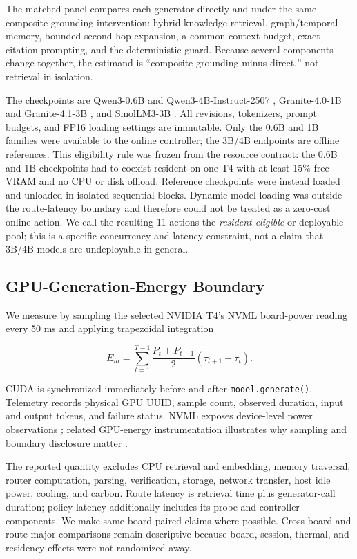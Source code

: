 The matched panel compares each generator directly and under the same composite
grounding intervention: hybrid knowledge retrieval, graph/temporal memory, bounded
second-hop expansion, a common context budget, exact-citation prompting, and the
deterministic guard. Because several components change together, the estimand is
``composite grounding minus direct,'' not retrieval in isolation.



The checkpoints are Qwen3-0.6B and Qwen3-4B-Instruct-2507
\cite{QwenTeam2025Qwen3,QwenModelCard06,QwenModelCard4B}, Granite-4.0-1B and
Granite-4.1-3B \cite{GraniteTeam2025Granite40,GraniteTeam2026Granite41}, and
SmolLM3-3B \cite{BakouchEtAl2025SmolLM3}. All revisions, tokenizers, prompt budgets,
and FP16 loading settings are immutable. Only the 0.6B and 1B families were
available to the online controller; the 3B/4B endpoints are offline references.
This eligibility rule was frozen from the resource contract: the 0.6B and 1B
checkpoints had to coexist resident on one T4 with at least 15\% free VRAM and no
CPU or disk offload. Reference checkpoints were instead loaded and unloaded in
isolated sequential blocks. Dynamic model loading was outside the route-latency
boundary and therefore could not be treated as a zero-cost online action. We call
the resulting 11 actions the \emph{resident-eligible} or deployable pool; this is a
specific concurrency-and-latency constraint, not a claim that 3B/4B models are
undeployable in general.

\subsection{GPU-Generation-Energy Boundary}

We measure \gpuenergy{} by sampling the selected NVIDIA T4's NVML board-power
reading every 50 ms and applying trapezoidal integration

\begin{equation}
E_{ia}=\sum_{t=1}^{T-1}
\frac{P_t+P_{t+1}}{2}(\tau_{t+1}-\tau_t).
\label{eq:energy}
\end{equation}

CUDA is synchronized immediately before and after \texttt{model.generate()}.
Telemetry records physical GPU UUID, sample count, observed duration, input and
output tokens, and failure status. NVML exposes device-level power observations
\cite{NVIDIA2026NVML}; related GPU-energy instrumentation illustrates why sampling
and boundary disclosure matter \cite{YouEtAl2023Zeus}.

The reported quantity excludes CPU retrieval and embedding, memory traversal,
router computation, parsing, verification, storage, network transfer, host idle
power, cooling, and carbon. Route latency is retrieval time plus generator-call
duration; policy latency additionally includes its probe and controller components.
We make same-board paired claims where possible. Cross-board and route-major
comparisons remain descriptive because board, session, thermal, and residency
effects were not randomized away.
